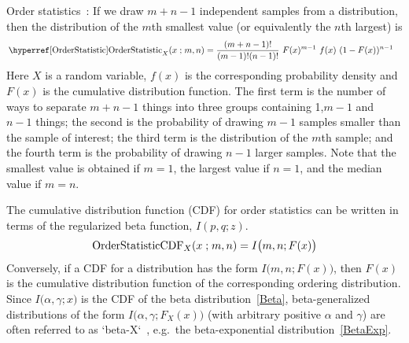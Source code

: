 

\clearpage
{}


\label{OrderStatistic}
Order statistics~\cite{David2005}: If we draw $m+n-1$ independent samples from a distribution, then the distribution of the $m$th smallest value (or equivalently the $n$th largest) is
\begin{align*}
&\opr{OrderStatistic}_{X}(x \given m, n)  
= \frac{(m+n-1)!}{(m-1)!(n-1)!} \ F(x)^{m-1}\ f(x)\ (1- F(x))^{n-1}
\checked
\end{align*}
Here $X$ is a random variable, $f(x)$ is the corresponding probability density and $F(x)$ is the cumulative distribution function. The first term is the number of ways to separate $m+n-1$ things into three groups containing 1,$m-1$ and $n-1$ things; the second is the probability of drawing $m-1$ samples smaller than the sample of interest; the third term is the distribution of the $m$th sample; and the fourth term is the probability of drawing $n-1$ larger samples. Note that the smallest value is obtained if $m=1$, the largest value if $n=1$, and the median value if $m=n$.

The cumulative distribution function (CDF) for order statistics can be written in terms of the regularized beta function, $I(p,q;z)$.
\begin{align*}
\op{OrderStatisticCDF}_{X}(x \given m, n)  = I\bigl(m,n; F(x) \bigr)
\checked
\end{align*}
Conversely, if a CDF for a distribution has the form $I\bigl(m,n; F(x) \bigr)$, then $F(x)$ is the cumulative distribution function of the corresponding ordering distribution. Since $I\bigl(\alpha,\gamma;x \bigr)$ is the CDF of the beta distribution~\eqref{Beta}, beta-generalized distributions of the form $I\bigl(\alpha,\gamma; F_X(x) \bigr)$ (with arbitrary positive $\alpha$ and $\gamma$) are often referred to as `beta-X`~\cite{Eugene2002}, e.g.\ the beta-exponential distribution~\eqref{BetaExp}.


